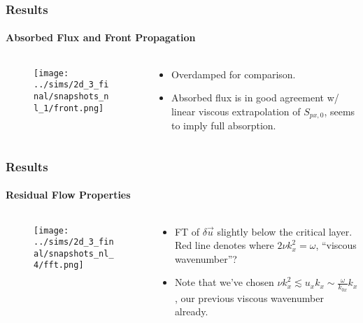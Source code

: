 \documentclass[dvipsnames]{beamer}
\begin{document}
\begin{frame}
    \frametitle{Results}
    \framesubtitle{Absorbed Flux and Front Propagation}

    \begin{columns}
        \begin{column}{0.5\textwidth}
            \begin{figure}[t]
                \centering
                \texttt{[image: ../sims/2d\_3\_final/snapshots\_nl\_1/front.png]}
            \end{figure}
        \end{column}
        \begin{column}{0.5\textwidth}
            \begin{itemize}
                \item Overdamped for comparison.

                \item Absorbed flux is in good agreement w/ linear viscous
                    extrapolation of $S_{px, 0}$, seems to imply full
                    absorption.
            \end{itemize}
        \end{column}
    \end{columns}
\end{frame}

\begin{frame}
    \frametitle{Results}
    \framesubtitle{Residual Flow Properties}

    \begin{columns}
        \begin{column}{0.5\textwidth}
            \begin{figure}[t]
                \centering
                \texttt{[image: ../sims/2d\_3\_final/snapshots\_nl\_4/fft.png]}
            \end{figure}
        \end{column}
        \begin{column}{0.5\textwidth}
            \begin{itemize}
                \item FT of $\delta \vec{u}$ slightly below the critical layer.
                    Red line denotes where $2\nu k_x^2 = \omega$, ``viscous
                    wavenumber''?

                \item Note that we've chosen $\nu k_x^2 \lesssim u_xk_x \sim
                    \frac{\omega}{k_{0x}}k_x$, our previous viscous wavenumber
                    already.
            \end{itemize}
        \end{column}
    \end{columns}
\end{frame}
\end{document}
